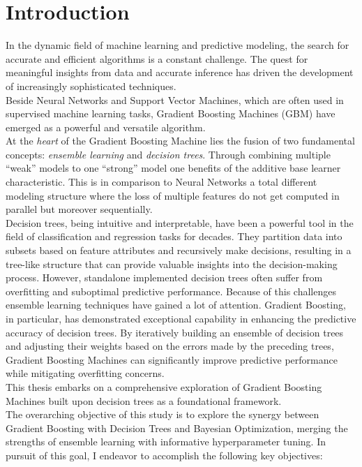 \documentclass[12pt, a4paper]{article}
\begin{document}
\section{Introduction}
In the dynamic field of machine learning and predictive modeling, the search for accurate and efficient algorithms is a constant challenge. The quest for meaningful insights from data and accurate inference has driven the development of increasingly sophisticated techniques. \\
Beside Neural Networks and Support Vector Machines, which are often used in supervised machine learning tasks, Gradient Boosting Machines (GBM) have emerged as a powerful and versatile algorithm. \\
At the \textit{heart} of the Gradient Boosting Machine lies the fusion of two fundamental concepts: \textit{ensemble learning} and \textit{decision trees}. Through combining multiple ``weak'' models to one ``strong'' model one benefits of the additive base learner characteristic. This is in comparison to Neural Networks a total different modeling structure where the loss of multiple features do not get computed in parallel but moreover sequentially. \\
Decision trees, being intuitive and interpretable, have been a powerful tool in the field of classification and regression tasks for decades. They partition data into subsets based on feature attributes and recursively make decisions, resulting in a tree-like structure that can provide valuable insights into the decision-making process. However, standalone implemented decision trees often suffer from overfitting and suboptimal predictive performance. Because of this challenges ensemble learning techniques have gained a lot of attention.
Gradient Boosting, in particular, has demonstrated exceptional capability in enhancing the predictive accuracy of decision trees. By iteratively building an ensemble of decision trees and adjusting their weights based on the errors made by the preceding trees, Gradient Boosting Machines can significantly improve predictive performance while mitigating overfitting concerns. \\
This thesis embarks on a comprehensive exploration of Gradient Boosting Machines built upon decision trees as a foundational framework. \\
The overarching objective of this study is to explore the synergy between Gradient Boosting with Decision Trees and Bayesian Optimization, merging the strengths of ensemble learning with informative hyperparameter tuning. In pursuit of this goal, I endeavor to accomplish the following key objectives:\\
\end{document}
